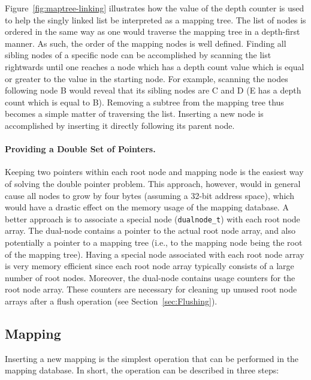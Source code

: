 \documentclass[a4paper,twoside]{book}
\begin{document}
Figure~\ref{fig:maptree-linking} illustrates how the value of the
depth counter is used to help the singly linked list be interpreted as
a mapping tree.  The list of nodes is ordered in the same way as one
would traverse the mapping tree in a depth-first manner.  As such, the
order of the mapping nodes is well defined.  Finding all sibling nodes
of a specific node can be accomplished by scanning the list rightwards
until one reaches a node which has a depth count value which is equal
or greater to the value in the starting node.  For example, scanning
the nodes following node B would reveal that its sibling nodes are C
and D (E has a depth count which is equal to B).  Removing a subtree
from the mapping tree thus becomes a simple matter of traversing the
list.  Inserting a new node is accomplished by inserting it directly
following its parent node.

\paragraph{Providing a Double Set of Pointers.}

Keeping two pointers within each root node and mapping node is the
easiest way of solving the double pointer problem.  This approach,
however, would in general cause all nodes to grow by four bytes
(assuming a 32-bit address space), which would have a drastic effect
on the memory usage of the mapping database.  A better approach is to
associate a special node (\texttt{dualnode\_t}) with each root node
array.  The dual-node contains a pointer to the actual root node
array, and also potentially a pointer to a mapping tree (i.e., to the
mapping node being the root of the mapping tree).  Having a special
node associated with each root node array is very memory efficient
since each root node array typically consists of a large number of
root nodes.  Moreover, the dual-node contains usage counters for the
root node array.  These counters are necessary for cleaning up unused
root node arrays after a flush operation (see
Section~\ref{sec:Flushing}).


\subsection{Mapping}

Inserting a new mapping is the simplest operation that can be
performed in the mapping database.  In short, the operation can be
described in three steps:
\end{document}
